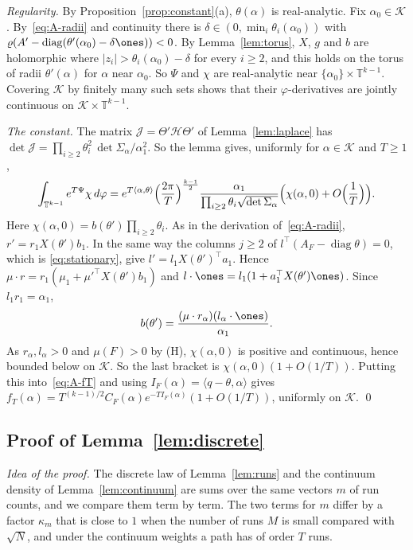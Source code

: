 \emph{Regularity.} By Proposition~\ref{prop:constant}(a), $\theta(\alpha)$ is
real-analytic. Fix $\alpha_0\in\mathcal K$. By~\eqref{eq:A-radii} and
continuity there is $\delta\in(0,\min_i\theta_i(\alpha_0))$ with
$\varrho(A'-\operatorname{diag}(\theta'(\alpha_0)-\delta\ones))<0$. By
Lemma~\ref{lem:torus}, $X$, $g$ and $b$ are holomorphic where
$|z_i|>\theta_i(\alpha_0)-\delta$ for every $i\ge2$, and this holds
on the torus of radii $\theta'(\alpha)$ for $\alpha$ near $\alpha_0$. So $\Psi$
and $\chi$ are real-analytic near $\{\alpha_0\}\times\mathbb T^{k-1}$.
Covering $\mathcal K$ by finitely many such sets shows that their
$\varphi$-derivatives are jointly continuous on
$\mathcal K\times\mathbb T^{k-1}$.

\emph{The constant.} The matrix $\mathcal J=\Theta'\mathcal H\Theta'$ of
Lemma~\ref{lem:laplace} has
$\det\mathcal J=\prod_{i\ge2}\theta_i^2\,\det\Sigma_\alpha/\alpha_1^2$. So
the lemma gives, uniformly for $\alpha\in\mathcal K$ and $T\ge1$,
\[
\int_{\mathbb T^{k-1}}e^{T\Psi}\chi\,d\varphi
=e^{T\langle\alpha,\theta\rangle}\Bigl(\frac{2\pi}T\Bigr)^{\frac{k-1}2}
\frac{\alpha_1}{\prod_{i\ge2}\theta_i\sqrt{\det\Sigma_\alpha}}
\Bigl(\chi(\alpha,0)+O\Bigl(\frac1T\Bigr)\Bigr).
\]
Here $\chi(\alpha,0)=b(\theta')\prod_{i\ge2}\theta_i$. As in the derivation
of~\eqref{eq:A-radii}, $r'=r_1X(\theta')b_1$. In the same way the columns
$j\ge2$ of $l^\top(A_F-\operatorname{diag}\theta)=0$, which is
\eqref{eq:stationary}, give $l'=l_1X(\theta')^\top a_1$. Hence
$\mu\cdot r=r_1(\mu_1+\mu'^\top X(\theta')b_1)$ and
$l\cdot\ones=l_1(1+a_1^\top X(\theta')\ones)$. Since $l_1r_1=\alpha_1$,
\[
b(\theta')=\frac{(\mu\cdot r_\alpha)(l_\alpha\cdot\ones)}{\alpha_1}.
\]
As $r_\alpha,l_\alpha>0$ and $\mu(F)>0$ by (H), $\chi(\alpha,0)$ is positive
and continuous, hence bounded below on $\mathcal K$. So the last bracket is
$\chi(\alpha,0)(1+O(1/T))$. Putting this into~\eqref{eq:A-fT} and using
$I_F(\alpha)=\langle q-\theta,\alpha\rangle$ gives
$f_T(\alpha)=T^{(k-1)/2}C_F(\alpha)e^{-TI_F(\alpha)}(1+O(1/T))$, uniformly on
$\mathcal K$. \qed

\subsection{Proof of \texorpdfstring{Lemma~\ref{lem:discrete}}{the discrete
law}}

\emph{Idea of the proof.} The discrete law of Lemma~\ref{lem:runs} and the
continuum density of Lemma~\ref{lem:continuum} are sums over the same vectors
$m$ of run counts, and we compare them term by term. The two terms for $m$
differ by a factor $\kappa_m$ that is close to $1$ when the number of runs
$M$ is small compared with $\sqrt N$, and under the continuum weights a path
has of order $T$ runs.

